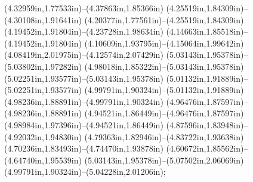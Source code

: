 (4.32959in,1.77533in)--(4.37863in,1.85366in) (4.25519in,1.84309in)--(4.30108in,1.91641in) (4.20377in,1.77561in)--(4.25519in,1.84309in) (4.19452in,1.91804in)--(4.23728in,1.98634in) (4.14663in,1.85518in)--(4.19452in,1.91804in) (4.10609in,1.93795in)--(4.15064in,1.99642in) (4.08419in,2.01975in)--(4.12574in,2.07429in) (5.03143in,1.95378in)--(5.03802in,1.97282in) (4.98018in,1.85322in)--(5.03143in,1.95378in) (5.02251in,1.93577in)--(5.03143in,1.95378in) (5.01132in,1.91889in)--(5.02251in,1.93577in) (4.99791in,1.90324in)--(5.01132in,1.91889in) (4.98236in,1.88891in)--(4.99791in,1.90324in) (4.96476in,1.87597in)--(4.98236in,1.88891in) (4.94521in,1.86449in)--(4.96476in,1.87597in) (4.98984in,1.97396in)--(4.94521in,1.86449in) (4.87596in,1.83948in)--(4.92032in,1.94830in) (4.79363in,1.82946in)--(4.83722in,1.93638in) (4.70236in,1.83493in)--(4.74470in,1.93878in) (4.60672in,1.85562in)--(4.64740in,1.95539in) (5.03143in,1.95378in)--(5.07502in,2.06069in) (4.99791in,1.90324in)--(5.04228in,2.01206in);
